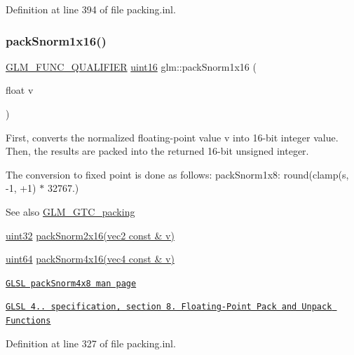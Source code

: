 Definition at line 394 of file packing.\+inl.

\mbox{\label{group__gtc__packing_gac29411d6c0f6ed0fe9f0396dfe92e0e8}} 
\subsubsection{\texorpdfstring{pack\+Snorm1x16()}{packSnorm1x16()}}
{\footnotesize\ttfamily \hyperlink{setup_8hpp_a33fdea6f91c5f834105f7415e2a64407}{G\+L\+M\+\_\+\+F\+U\+N\+C\+\_\+\+Q\+U\+A\+L\+I\+F\+I\+ER} \hyperlink{group__gtc__type__precision_gad8c2939e1fdd8e5828b31d95c52255d5}{uint16} glm\+::pack\+Snorm1x16 (\begin{DoxyParamCaption}\item[{float}]{v }\end{DoxyParamCaption})}

First, converts the normalized floating-\/point value v into 16-\/bit integer value. Then, the results are packed into the returned 16-\/bit unsigned integer.

The conversion to fixed point is done as follows\+: pack\+Snorm1x8\+: round(clamp(s, -\/1, +1) $\ast$ 32767.)

\begin{DoxySeeAlso}{See also}
\hyperlink{group__gtc__packing}{G\+L\+M\+\_\+\+G\+T\+C\+\_\+packing} 

\hyperlink{group__gtc__type__precision_ga202b6a53c105fcb7e531f9b443518451}{uint32} \hyperlink{group__core__func__packing_ga0c8005de240d6c4ca3d16c7bee25c622}{pack\+Snorm2x16(vec2 const \& v)} 

\hyperlink{group__gtc__type__precision_gae3632bf9b37da66233d78930dd06378a}{uint64} \hyperlink{group__gtc__packing_ga9b237d7c66b7a71964e6d1f4dc06539f}{pack\+Snorm4x16(vec4 const \& v)} 

\href{http://www.opengl.org/sdk/docs/manglsl/xhtml/packSnorm4x8.xml}{\tt G\+L\+SL pack\+Snorm4x8 man page} 

\href{http://www.opengl.org/registry/doc/GLSLangSpec.4.20.8.pdf}{\tt G\+L\+SL 4.. specification, section 8. Floating-\/\+Point Pack and Unpack Functions} 
\end{DoxySeeAlso}


Definition at line 327 of file packing.\+inl.


